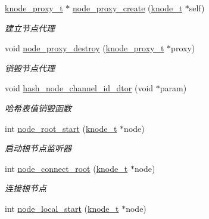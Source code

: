 \begin{DoxyCompactItemize}
\hyperlink{a00066_a5025c3e4422f5f55b981aad6e56b6d89_a5025c3e4422f5f55b981aad6e56b6d89}{knode\+\_\+proxy\+\_\+t} $\ast$ \hyperlink{a00102_ab454c97d2a6363ac5f69e954bad84992_ab454c97d2a6363ac5f69e954bad84992}{node\+\_\+proxy\+\_\+create} (\hyperlink{a00066_a5e720b27efbc9ad744240f5f4233763a_a5e720b27efbc9ad744240f5f4233763a}{knode\+\_\+t} $\ast$self)
\begin{DoxyCompactList}\small\item\em 建立节点代理 \end{DoxyCompactList}\item 
void \hyperlink{a00102_af6bad41d52b417a55c11da5cea7fc3fb_af6bad41d52b417a55c11da5cea7fc3fb}{node\+\_\+proxy\+\_\+destroy} (\hyperlink{a00066_a5025c3e4422f5f55b981aad6e56b6d89_a5025c3e4422f5f55b981aad6e56b6d89}{knode\+\_\+proxy\+\_\+t} $\ast$proxy)
\begin{DoxyCompactList}\small\item\em 销毁节点代理 \end{DoxyCompactList}\item 
void \hyperlink{a00102_a19fc8de5ab5967c2625e61ff869f6547_a19fc8de5ab5967c2625e61ff869f6547}{hash\+\_\+node\+\_\+channel\+\_\+id\+\_\+dtor} (void $\ast$param)
\begin{DoxyCompactList}\small\item\em 哈希表值销毁函数 \end{DoxyCompactList}\item 
int \hyperlink{a00102_a8fe081822efe2065d27b69ab0c2f1386_a8fe081822efe2065d27b69ab0c2f1386}{node\+\_\+root\+\_\+start} (\hyperlink{a00066_a5e720b27efbc9ad744240f5f4233763a_a5e720b27efbc9ad744240f5f4233763a}{knode\+\_\+t} $\ast$node)
\begin{DoxyCompactList}\small\item\em 启动根节点监听器 \end{DoxyCompactList}\item 
int \hyperlink{a00102_a9bae6e0e7f362d9dae9ee27d42ad0e78_a9bae6e0e7f362d9dae9ee27d42ad0e78}{node\+\_\+connect\+\_\+root} (\hyperlink{a00066_a5e720b27efbc9ad744240f5f4233763a_a5e720b27efbc9ad744240f5f4233763a}{knode\+\_\+t} $\ast$node)
\begin{DoxyCompactList}\small\item\em 连接根节点 \end{DoxyCompactList}\item 
int \hyperlink{a00102_aa7e1bfaa23bf8cc7241c034063296cf6_aa7e1bfaa23bf8cc7241c034063296cf6}{node\+\_\+local\+\_\+start} (\hyperlink{a00066_a5e720b27efbc9ad744240f5f4233763a_a5e720b27efbc9ad744240f5f4233763a}{knode\+\_\+t} $\ast$node)

\end{DoxyCompactItemize}
